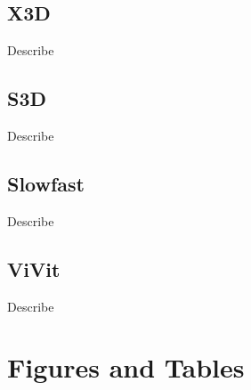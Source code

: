\subsection*{X3D}
Describe

\subsection*{S3D}
Describe

\subsection*{Slowfast}
Describe

\subsection*{ViVit}
Describe

\newpage
\section{Figures and Tables}

